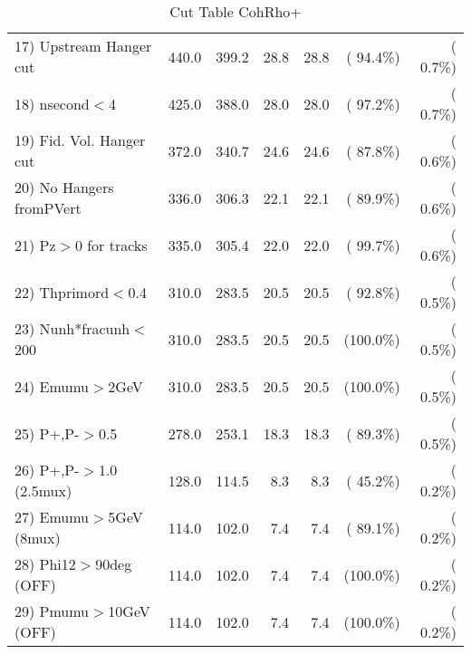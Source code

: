 \begin{table}[h!]
\begin{tabular}{||l||r|r|r|r|r|r||}
 17) Upstream Hanger cut  &        440.0 &        399.2 &         28.8 &         28.8 & ( 94.4\%) & (  0.7\%) \\
 18) nsecond$<$4          &        425.0 &        388.0 &         28.0 &         28.0 & ( 97.2\%) & (  0.7\%) \\
 19) Fid. Vol. Hanger cut &        372.0 &        340.7 &         24.6 &         24.6 & ( 87.8\%) & (  0.6\%) \\
 20) No Hangers fromPVert &        336.0 &        306.3 &         22.1 &         22.1 & ( 89.9\%) & (  0.6\%) \\
 21) Pz$>$0 for tracks    &        335.0 &        305.4 &         22.0 &         22.0 & ( 99.7\%) & (  0.6\%) \\
 22) Thprimord$<$0.4      &        310.0 &        283.5 &         20.5 &         20.5 & ( 92.8\%) & (  0.5\%) \\
 23) Nunh*fracunh$<$200   &        310.0 &        283.5 &         20.5 &         20.5 & (100.0\%) & (  0.5\%) \\
 24) Emumu$>$2GeV         &        310.0 &        283.5 &         20.5 &         20.5 & (100.0\%) & (  0.5\%) \\
 25) P+,P-$>$0.5          &        278.0 &        253.1 &         18.3 &         18.3 & ( 89.3\%) & (  0.5\%) \\
 26) P+,P-$>$1.0 (2.5mux) &        128.0 &        114.5 &          8.3 &          8.3 & ( 45.2\%) & (  0.2\%) \\
 27) Emumu$>$5GeV  (8mux) &        114.0 &        102.0 &          7.4 &          7.4 & ( 89.1\%) & (  0.2\%) \\
 28) Phi12$>$90deg  (OFF) &        114.0 &        102.0 &          7.4 &          7.4 & (100.0\%) & (  0.2\%) \\
 29) Pmumu$>$10GeV  (OFF) &        114.0 &        102.0 &          7.4 &          7.4 & (100.0\%) & (  0.2\%) \\
 \hline
 \hline
 \end{tabular}
 \caption{Cut Table  CohRho+  }
 \label{tab-cutcohjpsi-mumu_anumunc}
 \end{table}
